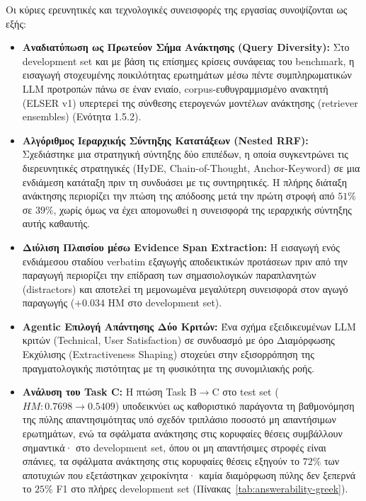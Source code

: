 Οι κύριες ερευνητικές και τεχνολογικές συνεισφορές της εργασίας συνοψίζονται ως εξής:
\begin{itemize}
    \item \textbf{Αναδιατύπωση ως Πρωτεύον Σήμα Ανάκτησης (Query Diversity):} Στο development set και με βάση τις επίσημες κρίσεις συνάφειας του benchmark, η εισαγωγή στοχευμένης ποικιλότητας ερωτημάτων μέσω πέντε συμπληρωματικών LLM προτροπών πάνω σε έναν ενιαίο, corpus-ευθυγραμμισμένο ανακτητή (ELSER v1) υπερτερεί της σύνθεσης ετερογενών μοντέλων ανάκτησης (retriever ensembles) (Ενότητα 1.5.2).
    \item \textbf{Αλγόριθμος Ιεραρχικής Σύντηξης Κατατάξεων (Nested RRF):} Σχεδιάστηκε μια στρατηγική σύντηξης δύο επιπέδων, η οποία συγκεντρώνει τις διερευνητικές στρατηγικές (HyDE, Chain-of-Thought, Anchor-Keyword) σε μια ενδιάμεση κατάταξη πριν τη συνδυάσει με τις συντηρητικές. Η πλήρης διάταξη ανάκτησης περιορίζει την πτώση της απόδοσης μετά την πρώτη στροφή από $51\%$ σε $39\%$, χωρίς όμως να έχει απομονωθεί η συνεισφορά της ιεραρχικής σύντηξης αυτής καθαυτής.
    \item \textbf{Διύλιση Πλαισίου μέσω Evidence Span Extraction:} Η εισαγωγή ενός ενδιάμεσου σταδίου verbatim εξαγωγής αποδεικτικών προτάσεων πριν από την παραγωγή περιορίζει την επίδραση των σημασιολογικών παραπλανητών (distractors) και αποτελεί τη μεμονωμένα μεγαλύτερη συνεισφορά στον αγωγό παραγωγής ($+0.034$ HM στο development set).
    \item \textbf{Agentic Επιλογή Απάντησης Δύο Κριτών:} Ένα σχήμα εξειδικευμένων LLM κριτών (Technical, User Satisfaction) σε συνδυασμό με όρο Διαμόρφωσης Εκχύλισης (Extractiveness Shaping) στοχεύει στην εξισορρόπηση της πραγματολογικής πιστότητας με τη φυσικότητα της συνομιλιακής ροής.
    \item \textbf{Ανάλυση του Task C:} Η πτώση Task B$\rightarrow$C στο test set ($HM: 0.7698 \rightarrow 0.5409$) υποδεικνύει ως καθοριστικό παράγοντα τη βαθμονόμηση της πύλης απαντησιμότητας υπό σχεδόν τριπλάσιο ποσοστό μη απαντήσιμων ερωτημάτων, ενώ τα σφάλματα ανάκτησης στις κορυφαίες θέσεις συμβάλλουν σημαντικά· στο development set, όπου οι μη απαντήσιμες στροφές είναι σπάνιες, τα σφάλματα ανάκτησης στις κορυφαίες θέσεις εξηγούν το $72\%$ των αποτυχιών που εξετάστηκαν χειροκίνητα· καμία διαμόρφωση πύλης δεν ξεπερνά το $25\%$ F1 στο πλήρες development set (Πίνακας~\ref{tab:answerability-greek}).
\end{itemize}

